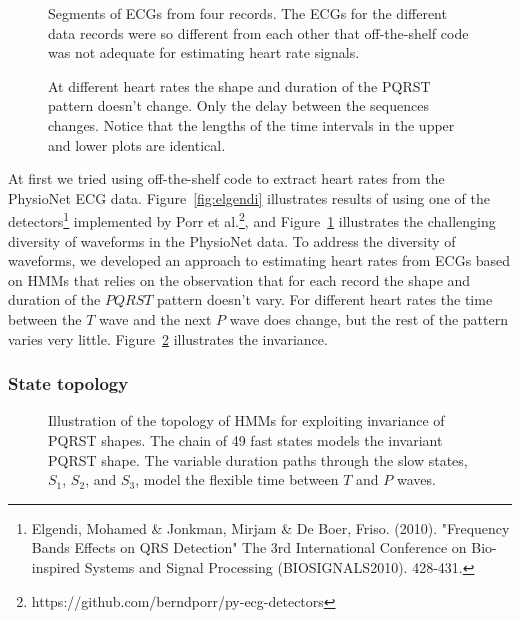 \begin{figure}
  \caption[Segments of ECGs from four records]%
  {Segments of ECGs from four records.  The ECGs for the different
    data records were so different from each other that off-the-shelf
    code was not adequate for estimating heart rate signals.}
  \label{fig:a03a10b03c02}
\end{figure}

\begin{figure}
  \caption[Invariant PQRST shape]%
  {At different heart rates the shape and duration of the PQRST
    pattern doesn’t change. Only the delay between the sequences
    changes.  Notice that the lengths of the time intervals in the
    upper and lower plots are identical.}
  \label{fig:constant_a03}
\end{figure}

At first we tried using off-the-shelf code to extract heart rates from
the PhysioNet ECG data.  Figure~\ref{fig:elgendi} illustrates results
of using one of the detectors\footnote{Elgendi, Mohamed \& Jonkman,
  Mirjam \& De Boer, Friso. (2010). "Frequency Bands Effects on QRS
  Detection" The 3rd International Conference on Bio-inspired Systems
  and Signal Processing (BIOSIGNALS2010). 428-431.} implemented by
Porr et al.\footnote{https://github.com/berndporr/py-ecg-detectors},
and Figure~\ref{fig:a03a10b03c02} illustrates the challenging
diversity of waveforms in the PhysioNet data.  To address the
diversity of waveforms, we developed an approach to estimating heart
rates from ECGs based on HMMs that relies on the observation that for
each record the shape and duration of the $PQRST$ pattern doesn't
vary.  For different heart rates the time between the $T$ wave and the
next $P$ wave does change, but the rest of the pattern varies very
little.  Figure~\ref{fig:constant_a03} illustrates the invariance.

\subsubsection{State topology}
\label{sec:state_topology}

\begin{figure}
  \centering{\resizebox{0.5\textwidth}{!}{}
  }
  \caption[Topology of HMMs for exploiting invariance of PQRST
  shapes]{Illustration of the topology of HMMs for exploiting
    invariance of PQRST shapes. The chain of 49 fast states models the
    invariant PQRST shape.  The variable duration paths through the
    slow states, $S_1$, $S_2$, and $S_3$, model the flexible time
    between $T$ and $P$ waves.}
  \label{fig:ecg_hmm}
\end{figure}

